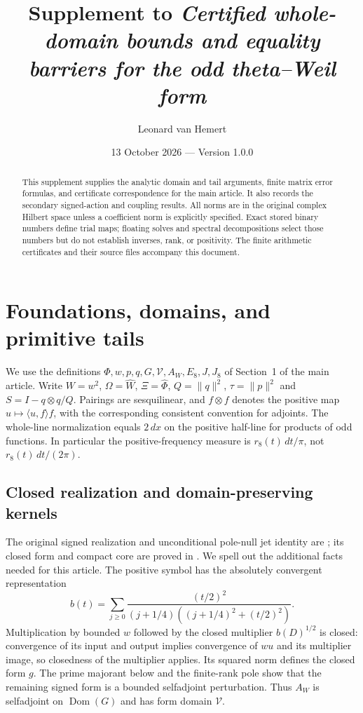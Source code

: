 \documentclass[11pt]{article}
\title{Supplement to \emph{Certified whole-domain bounds and equality barriers
for the odd theta--Weil form}}
\author{Leonard van Hemert}
\date{13 October 2026 --- Version 1.0.0}
\newcommand{\Dom}{\operatorname{Dom}}
\newcommand{\dd}{\,d}
\numberwithin{equation}{section}
\begin{document}
\maketitle
\begin{abstract}
This supplement supplies the analytic domain and tail arguments, finite
matrix error formulas, and certificate correspondence for the main article.
It also records the secondary signed-action and coupling results. All
norms are in the original complex Hilbert space unless a coefficient
norm is explicitly specified. Exact stored binary numbers define trial
maps; floating solves and spectral decompositions select those numbers
but do not establish inverses, rank, or positivity. The finite arithmetic
certificates and their source files accompany this document.
\end{abstract}
\tableofcontents
\setcounter{section}{-1}
\section{Foundations, domains, and primitive tails}\label{foundations}
We use the definitions $\Phi,w,p,q,G,\mathcal V,A_W,E_8,J,J_8$ of
Section~1 of the main article. Write $W=w^2$, $\Omega=\widehat W$,
$\Xi=\widehat\Phi$, $Q=\|q\|^2$, $\tau=\|p\|^2$ and
$S=I-q\otimes q/Q$. Pairings are sesquilinear, and $f\otimes f$
denotes the positive map $u\mapsto\langle u,f\rangle f$, with the
corresponding consistent convention for adjoints. The whole-line
normalization equals $2\dd x$ on the positive half-line for products
of odd functions. In particular the positive-frequency measure is
$r_8(t)\dd t/\pi$, not $r_8(t)\dd t/(2\pi)$.

\subsection{Closed realization and domain-preserving kernels}
The original signed realization and unconditional pole-null jet
identity are \cite[Lemma 5.1]{Theta}; its closed form and compact
core are proved in \cite[Lemma 2.2]{Theta}. We spell
out the additional facts needed for this article. The positive symbol has
the absolutely convergent representation
\[
 b(t)=\sum_{j\ge0}\frac{(t/2)^2}
 {(j+1/4)((j+1/4)^2+(t/2)^2)}.
\]
Multiplication by bounded $w$ followed by the closed multiplier
$b(D)^{1/2}$ is closed: convergence of its input and output implies
convergence of $wu$ and its multiplier image, so closedness of the
multiplier applies. Its squared norm defines the closed form $g$.
The prime majorant below and the finite-rank pole show that the
remaining signed form is a bounded selfadjoint perturbation. Thus
$A_W$ is selfadjoint on $\Dom(G)$ and has form domain $\mathcal V$.
\end{document}

